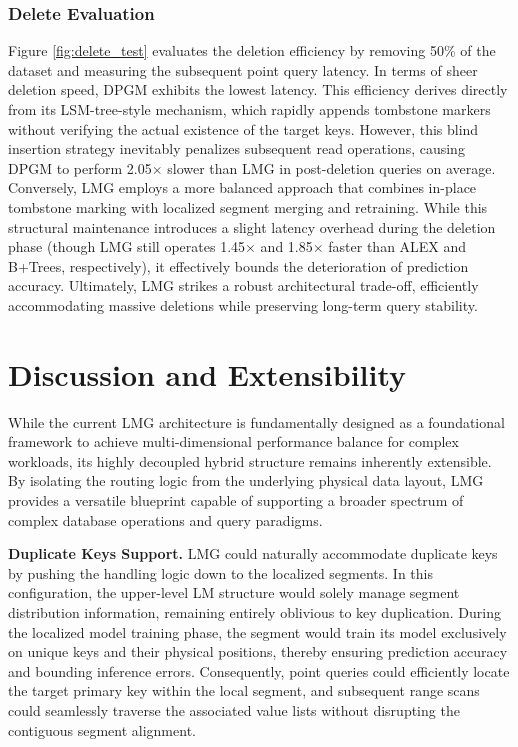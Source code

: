 \subsubsection{Delete Evaluation}
Figure \ref{fig:delete_test} evaluates the deletion efficiency by removing 50\% of the dataset and measuring the subsequent point query latency. In terms of sheer deletion speed, DPGM exhibits the lowest latency. This efficiency derives directly from its LSM-tree-style mechanism, which rapidly appends tombstone markers without verifying the actual existence of the target keys. However, this blind insertion strategy inevitably penalizes subsequent read operations, causing DPGM to perform 2.05$\times$ slower than LMG in post-deletion queries on average. Conversely, LMG employs a more balanced approach that combines in-place tombstone marking with localized segment merging and retraining. While this structural maintenance introduces a slight latency overhead during the deletion phase (though LMG still operates 1.45$\times$ and 1.85$\times$ faster than ALEX and B+Trees, respectively), it effectively bounds the deterioration of prediction accuracy. Ultimately, LMG strikes a robust architectural trade-off, efficiently accommodating massive deletions while preserving long-term query stability.

\section{Discussion and Extensibility}
\label{sec:extend}
While the current LMG architecture is fundamentally designed as a foundational framework to achieve multi-dimensional performance balance for complex workloads, its highly decoupled hybrid structure remains inherently extensible. By isolating the routing logic from the underlying physical data layout, LMG provides a versatile blueprint capable of supporting a broader spectrum of complex database operations and query paradigms.

\textbf{Duplicate Keys Support.} LMG could naturally accommodate duplicate keys by pushing the handling logic down to the localized segments. In this configuration, the upper-level LM structure would solely manage segment distribution information, remaining entirely oblivious to key duplication. During the localized model training phase, the segment would train its model exclusively on unique keys and their physical positions, thereby ensuring prediction accuracy and bounding inference errors. Consequently, point queries could efficiently locate the target primary key within the local segment, and subsequent range scans could seamlessly traverse the associated value lists without disrupting the contiguous segment alignment.

